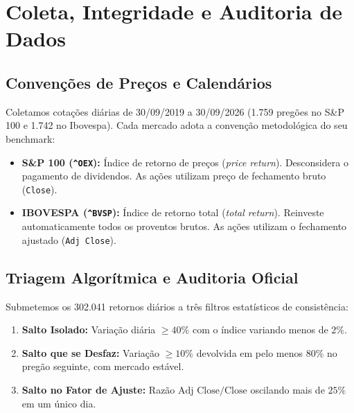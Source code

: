 \documentclass[11pt,a4paper]{article}
\begin{document}
\section{Coleta, Integridade e Auditoria de Dados}

\subsection{Convenções de Preços e Calendários}
Coletamos cotações diárias de 30/09/2019 a 30/09/2026 (1.759 pregões no S\&P 100 e 1.742 no Ibovespa). Cada mercado adota a convenção metodológica do seu benchmark:
\begin{itemize}
    \item \textbf{S\&P 100 (\texttt{\^{}OEX}):} Índice de retorno de preços (\textit{price return}). Desconsidera o pagamento de dividendos. As ações utilizam preço de fechamento bruto (\texttt{Close}).
    \item \textbf{IBOVESPA (\texttt{\^{}BVSP}):} Índice de retorno total (\textit{total return}). Reinveste automaticamente todos os proventos brutos. As ações utilizam o fechamento ajustado (\texttt{Adj Close}).
\end{itemize}

\subsection{Triagem Algorítmica e Auditoria Oficial}
Submetemos os 302.041 retornos diários a três filtros estatísticos de consistência:
\begin{enumerate}
    \item \textbf{Salto Isolado:} Variação diária $\ge 40\%$ com o índice variando menos de $2\%$.
    \item \textbf{Salto que se Desfaz:} Variação $\ge 10\%$ devolvida em pelo menos $80\%$ no pregão seguinte, com mercado estável.
    \item \textbf{Salto no Fator de Ajuste:} Razão $\text{Adj Close}/\text{Close}$ oscilando mais de $25\%$ em um único dia.
\end{enumerate}
\end{document}
